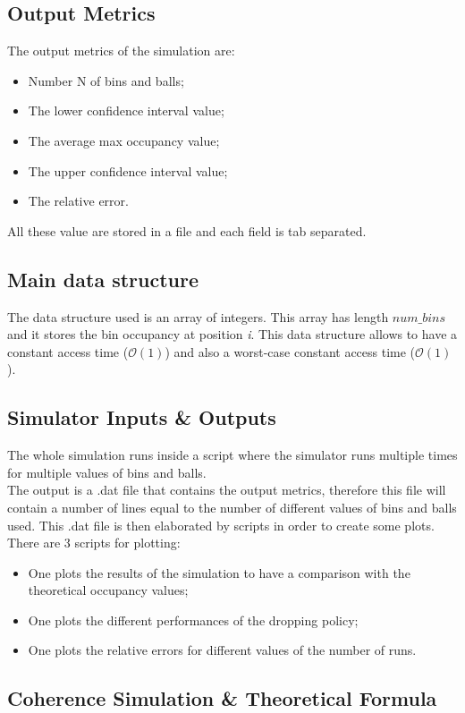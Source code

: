 \documentclass[twocolumn,letterpaper]{report}
\begin{document}
{	\subsection{Output Metrics}
			The output metrics of the simulation are:
			\begin{itemize}
				\item Number N of bins and balls;
				\item The lower confidence interval value;
				\item The average max occupancy value;
				\item The upper confidence interval value;
				\item The relative error.
			\end{itemize}
			All these value are stored in a file and each field is tab separated.
	
	\subsection{Main data structure}
			The data structure used is an array of integers. This array has length $num\_bins$ and it stores the bin occupancy at position \emph{i}. This data structure allows to have a constant access time ($\mathcal{O}(1)$) and also a worst-case constant access time ($\mathcal{O}(1)$).
			
	\subsection{Simulator Inputs \& Outputs}
			The whole simulation runs inside a script where the simulator runs multiple times for multiple values of bins and balls. \\
			The output is a .dat file that contains the output metrics, therefore this file will contain a number of lines equal to the number of different values of bins and balls used. This .dat file is then elaborated by scripts in order to create some plots. There are 3 scripts for plotting:
			\begin{itemize}
				\item One plots the results of the simulation to have a comparison with the theoretical occupancy values;
				\item One plots the different performances of the dropping policy;
				\item One plots the relative errors for different values of the number of runs.
			\end{itemize}
			
			\subsection{Coherence Simulation \& Theoretical Formula}
			
}
\end{document}
